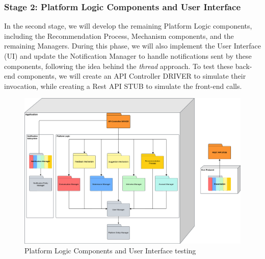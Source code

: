     \subsubsection{Stage 2: Platform Logic Components and User Interface}
    In the second stage, we will develop the remaining Platform Logic components, including the Recommendation Process, Mechanism components, and the remaining Managers. During this phase, we will also implement the User Interface (UI) and update the Notification Manager to handle notifications sent by these components, following the idea behind the \textit{thread} approach. To test these back-end components, we will create an API Controller DRIVER to simulate their invocation, while creating a Rest API STUB to simulate the front-end calls.\\
    \begin{figure}[H]
    \includegraphics[width=\linewidth]{Latex/Images/DD/Testing/TestingPlanStep2.png}
    \caption{Platform Logic Components and User Interface testing}
    \label{fig:test-step2}
    \end{figure}
    
    \clearpage
